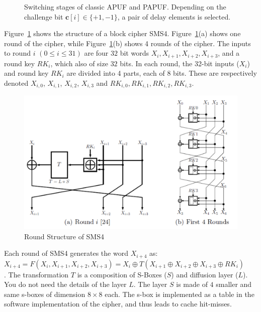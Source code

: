 \documentclass{article}
\begin{document}
\begin{questions}
\begin{figure}
\caption{Switching stages of classic APUF and PAPUF. Depending on the challenge bit $\mathrm{\mathbf {c}}[i] \in \{+1,-1\}$, a pair of delay elements is selected.}

\end{figure}



\question Figure~\ref{fig:SMS4} shows the structure of a block cipher SMS4. Figure~\ref{fig:SMS4}(a) shows one round of the cipher, while 
Figure~\ref{fig:SMS4}(b) shows 4 rounds of the cipher. 
The inputs to round $i$ $(0 \le i \le 31)$ are four $32$ bit words $X_i,X_{i+1},X_{i+2},X_{i+3}$, 
and a round key $RK_i$, which also of size $32$ bits. 
In each round, the 32-bit inputs ($X_i$) and round key $RK_i$ are divided into
4 parts, each of 8 bits. These are respectively denoted $X_{i,0}$, $X_{i,1}$, $X_{i,2}$, 
$X_{i,3}$ and
$RK_{i,0}, RK_{i,1}, RK_{i,2}, RK_{i,3}$.

\begin{figure}[h]
	\centering
	\includegraphics[scale=0.4]{SMS4.png}
    \caption{Round Structure of SMS4}
    \label{fig:SMS4}
\end{figure}

Each round of SMS4 generates the word $X_{i+4}$ as:\\
$X_{i+4} = F(X_i,X_{i+1},X_{i+2},X_{i+3})
= X_i \oplus T(X_{i+1} \oplus X_{i+2} \oplus X_{i+3} \oplus {RK_i})$\\. 
The transformation $T$ is a composition of S-Boxes ($S$) and diffusion layer ($L$). 
You do not need the details of the layer $L$. The layer $S$ is made of 
$4$ smaller and same s-boxes of dimension $8 \times 8$ each. 
The s-box is implemented as 
a table in the software implementation of the cipher, 
and thus leads to cache hit-misses. 


\end{questions}
\end{document}
